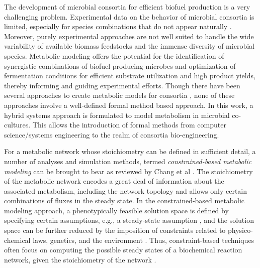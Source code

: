 


The development of microbial consortia for efficient biofuel production is a very challenging problem. Experimental data on the behavior of microbial consortia is limited, especially for species combinations that do not appear naturally \cite{Fazzinit10, Ramadas09, VerBerkmoes09}. Moreover, purely experimental approaches are not well suited to handle the wide variability of available biomass feedstocks and the immense diversity of microbial species. Metabolic modeling offers the potential for the identification of synergistic combinations of biofuel-producing microbes and optimization of fermentation conditions for efficient substrate utilization and high product yields, thereby informing and guiding experimental efforts. Though there have been several approaches to create metabolic models for consortia \cite{Biggs15}, none of these approaches involve a well-defined formal method based approach. In this work, a hybrid systems approach is formulated to model metabolism in microbial co-cultures. This allows the introduction of formal methods from computer science/systems engineering to the realm of consortia bio-engineering.


For a metabolic network whose stoichiometry can be defined in sufficient detail, a number of analyses and simulation methods, termed \textit{constrained-based metabolic modeling} can be brought to bear as reviewed by Chang et al \cite{Chang08}. The stoichiometry of the metabolic network encodes a great deal of information about the associated metabolism, including the network topology and allows only certain combinations of fluxes in the steady state. In the constrained-based metabolic modeling approach, a phenotypically feasible solution space is defined by specifying certain assumptions, e.g., a steady-state assumption \cite{Heirendt19}, and the solution space can be further reduced by the imposition of constraints related to physico-chemical laws, genetics, and the environment \cite{Heirendt19, O'Brien15}.  Thus, constraint-based techniques often focus on computing the possible steady states of a biochemical reaction network, given the stoichiometry of the network \cite{Wang17}. 

